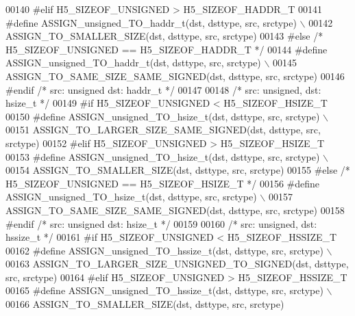 \begin{DoxyCode}
00140 \textcolor{preprocessor}{#elif H5\_SIZEOF\_UNSIGNED > H5\_SIZEOF\_HADDR\_T}
00141 \textcolor{preprocessor}{    #define ASSIGN\_unsigned\_TO\_haddr\_t(dst, dsttype, src, srctype) \(\backslash\)}
00142 \textcolor{preprocessor}{        ASSIGN\_TO\_SMALLER\_SIZE(dst, dsttype, src, srctype)}
00143 \textcolor{preprocessor}{#else }\textcolor{comment}{/* H5\_SIZEOF\_UNSIGNED == H5\_SIZEOF\_HADDR\_T */}\textcolor{preprocessor}{}
00144 \textcolor{preprocessor}{    #define ASSIGN\_unsigned\_TO\_haddr\_t(dst, dsttype, src, srctype) \(\backslash\)}
00145 \textcolor{preprocessor}{        ASSIGN\_TO\_SAME\_SIZE\_SAME\_SIGNED(dst, dsttype, src, srctype)}
00146 \textcolor{preprocessor}{#endif }\textcolor{comment}{/* src: unsigned dst: haddr\_t */}\textcolor{preprocessor}{}
00147 
00148 \textcolor{comment}{/* src: unsigned, dst: hsize\_t */}
00149 \textcolor{preprocessor}{#if H5\_SIZEOF\_UNSIGNED < H5\_SIZEOF\_HSIZE\_T}
00150 \textcolor{preprocessor}{    #define ASSIGN\_unsigned\_TO\_hsize\_t(dst, dsttype, src, srctype) \(\backslash\)}
00151 \textcolor{preprocessor}{        ASSIGN\_TO\_LARGER\_SIZE\_SAME\_SIGNED(dst, dsttype, src, srctype)}
00152 \textcolor{preprocessor}{#elif H5\_SIZEOF\_UNSIGNED > H5\_SIZEOF\_HSIZE\_T}
00153 \textcolor{preprocessor}{    #define ASSIGN\_unsigned\_TO\_hsize\_t(dst, dsttype, src, srctype) \(\backslash\)}
00154 \textcolor{preprocessor}{        ASSIGN\_TO\_SMALLER\_SIZE(dst, dsttype, src, srctype)}
00155 \textcolor{preprocessor}{#else }\textcolor{comment}{/* H5\_SIZEOF\_UNSIGNED == H5\_SIZEOF\_HSIZE\_T */}\textcolor{preprocessor}{}
00156 \textcolor{preprocessor}{    #define ASSIGN\_unsigned\_TO\_hsize\_t(dst, dsttype, src, srctype) \(\backslash\)}
00157 \textcolor{preprocessor}{        ASSIGN\_TO\_SAME\_SIZE\_SAME\_SIGNED(dst, dsttype, src, srctype)}
00158 \textcolor{preprocessor}{#endif }\textcolor{comment}{/* src: unsigned dst: hsize\_t */}\textcolor{preprocessor}{}
00159 
00160 \textcolor{comment}{/* src: unsigned, dst: hssize\_t */}
00161 \textcolor{preprocessor}{#if H5\_SIZEOF\_UNSIGNED < H5\_SIZEOF\_HSSIZE\_T}
00162 \textcolor{preprocessor}{    #define ASSIGN\_unsigned\_TO\_hssize\_t(dst, dsttype, src, srctype) \(\backslash\)}
00163 \textcolor{preprocessor}{        ASSIGN\_TO\_LARGER\_SIZE\_UNSIGNED\_TO\_SIGNED(dst, dsttype, src, srctype)}
00164 \textcolor{preprocessor}{#elif H5\_SIZEOF\_UNSIGNED > H5\_SIZEOF\_HSSIZE\_T}
00165 \textcolor{preprocessor}{    #define ASSIGN\_unsigned\_TO\_hssize\_t(dst, dsttype, src, srctype) \(\backslash\)}
00166 \textcolor{preprocessor}{        ASSIGN\_TO\_SMALLER\_SIZE(dst, dsttype, src, srctype)}

\end{DoxyCode}
